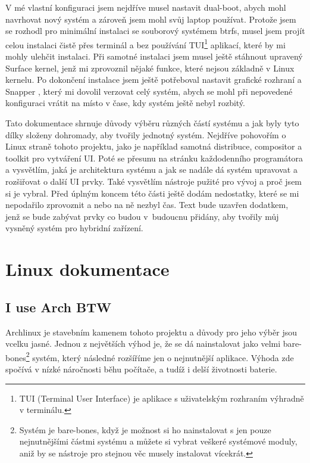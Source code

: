 \documentclass[12pt,a4paper]{article}
\begin{document}
V mé vlastní konfiguraci jsem nejdříve musel nastavit dual-boot, abych mohl navrhovat nový systém a
zároveň jsem mohl svůj laptop používat. Protože jsem se rozhodl pro minimální instalaci se souborový systémem btrfs,
musel jsem projít celou instalaci čistě přes terminál a bez používání TUI\footnote{TUI (Terminal User Interface) je 
aplikace s uživatelským rozhraním výhradně v terminálu.} 
aplikací, které by mi mohly ulehčit instalaci. Při samotné instalaci jsem musel ještě stáhnout
upravený Surface kernel, jenž mi zprovoznil nějaké funkce, které nejsou základně v Linux kernelu.
Po dokončení instalace jsem ještě potřeboval nastavit grafické rozhraní a Snapper
\autocite{SnapperUltimateSnapshot}, který mi dovolil verzovat celý systém, abych se mohl při nepovedené 
konfiguraci vrátit na místo v čase, kdy systém ještě nebyl rozbitý.

Tato dokumentace shrnuje důvody výběru různých částí systému a jak byly tyto dílky složeny dohromady, aby
tvořily jednotný systém. Nejdříve pohovořím o Linux straně tohoto projektu, jako je například samotná
distribuce, compositor a toolkit pro vytváření UI. Poté se přesunu na stránku každodenního programátora a
vysvětlím, jaká je architektura systému a jak se nadále dá systém upravovat a rozšiřovat o další UI prvky.
Také vysvětlím nástroje pužité pro vývoj a proč jsem si je vybral. Před úplným koncem této části
ještě dodám nedostatky, které se mi nepodařilo zprovoznit a nebo na ně nezbyl čas. Text bude uzavřen
dodatkem, jenž se bude zabývat prvky co budou v~budoucnu přidány, aby tvořily můj vysněný systém pro
hybridní zařízení.


\newpage
\section{Linux dokumentace}

\subsection{I use Arch BTW}
Archlinux \autocite{ArchWiki} je stavebním kamenem tohoto projektu a důvody pro jeho výběr jsou vcelku jasné. Jednou z 
největších výhod je, že se dá nainstalovat jako velmi bare-bones\footnote{Systém je bare-bones, když je možnost
si ho nainstalovat s jen pouze nejnutnějšími částmi systému a můžete si vybrat veškeré systémové moduly,
aniž by se nástroje pro stejnou věc musely instalovat vícekrát.} systém, který následné
rozšíříme jen o nejnutnější aplikace. Výhoda zde spočívá v nízké náročnosti běhu počítače, a tudíž i
delší životnosti baterie.
\end{document}
